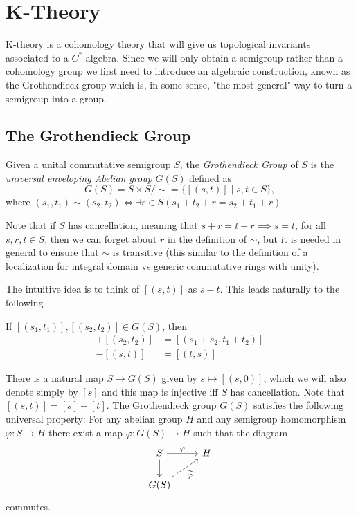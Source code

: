 \section{K-Theory}
K-theory is a cohomology theory that will give us topological invariants associated to a $C^\ast$-algebra. Since we will only obtain a semigroup rather than a cohomology group we first need to introduce an algebraic construction, known as the Grothendieck group which is, in some sense, "the most general" way to turn a semigroup into a group.

\subsection{The Grothendieck Group}
\begin{definition}
 Given a unital commutative semigroup $S$, the \emph{Grothendieck Group} of $S$ is the \emph{universal enveloping Abelian group} $G(S)$ defined as $$G(S)=S\times S/\sim=\{[(s,t)]\mid s,t\in S\},$$
 where $(s_1,t_1)\sim(s_2,t_2)\iff\exists r\in S(s_1+t_2+r=s_2+t_1+r)$.
\end{definition}
\begin{remark}
 Note that if $S$ has cancellation, meaning that $s+r=t+r\implies s=t$, for all $s,r,t\in S$, then we can forget about $r$ in the definition of $\sim$, but it is needed in general to ensure that $\sim$ is transitive (this similar to the definition of a localization for integral domain vs generic commutative rings with unity).
\end{remark}

\noindent The intuitive idea is to think of $[(s,t)]$ as $s-t$. This leads naturally to the following
\begin{definition}
 If $[(s_1,t_1)],[(s_2,t_2)]\in G(S)$, then \begin{align*}
                                             [(s_1,t_1)]+[(s_2,t_2)]&=[(s_1+s_2,t_1+t_2)] \\
                                             -[(s,t)]&=[(t,s)]
                                            \end{align*}

\end{definition}

\noindent There is a natural map $S\to G(S)$ given by $s\mapsto [(s,0)]$, which we will also denote simply by $[s]$ and this map is injective iff $S$ has cancellation. Note that $[(s,t)]=[s]-[t]$. The Grothendieck group $G(S)$ satisfies the following universal property: For any abelian group $H$ and any semigroup homomorphism $\varphi\colon S\to H$ there exist a map $\widetilde{\varphi}\colon G(S)\to H$ such that the diagram
$$\begin{tikzcd}
   S\arrow["\varphi",r] \arrow[d] & H \\
   G(S) \arrow["\widetilde{\varphi}"',ur,dashrightarrow]
  \end{tikzcd}
$$
commutes.

